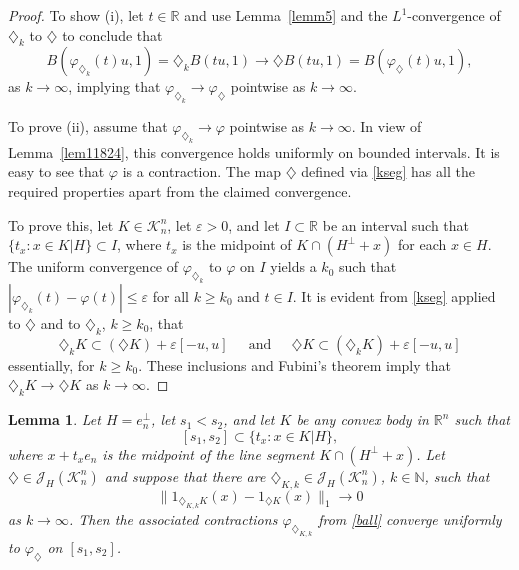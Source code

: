 \documentclass[12pt,reqno]{amsart}
\newcommand{\N}{{\mathbb N}}
\newcommand{\R}{{\mathbb R}}
\newcommand{\cK}{\mathcal K}
\newcommand{\cJ}{\mathcal J}
\newtheorem{lem}[thm]{Lemma}
\newcommand{\di}{\diamondsuit}
\numberwithin{equation}{section}
\begin{document}
\begin{proof}
To show (i), let $t\in \R$ and use Lemma~\ref{lemm5} and the $L^1$-convergence of $\di_k$ to $\di$ to conclude that
\[
B(\varphi_{\di_k}(t)u,1)=\di_k B(tu,1)\to\di B(tu,1)=B(\varphi_\di(t)u,1),
\]
as $k\to\infty$, implying that $\varphi_{\di_k}\to \varphi_\di$ pointwise as $k\to\infty$.

To prove (ii), assume that $\varphi_{\di_k}\to \varphi$ pointwise as $k\to\infty$. In view of Lemma~\ref{lem11824}, this convergence holds uniformly on bounded intervals. It is easy to see that $\varphi$ is a contraction.  The map $\di$ defined via \eqref{kseg} has all the required properties apart from the claimed convergence.

To prove this, let $K\in \cK_n^n$, let $\varepsilon>0$, and let $I\subset \R$ be an interval such that $\{t_x: x\in K|H\}\subset I$, where $t_x$ is the midpoint of $K\cap (H^{\perp}+x)$ for each $x\in H$. The uniform convergence of $\varphi_{\di_k}$ to $\varphi$ on $I$ yields a $k_0$ such that $|\varphi_{\di_k}(t)-\varphi(t)|\le \varepsilon$ for all $k\ge k_0$ and $t\in I$. It is evident from \eqref{kseg} applied to $\di$ and to $\di_k$, $k\ge k_0$, that
\[
 \di_k K\subset  (\di K)+\varepsilon [-u,u]~~\quad{\text{and}}~~\quad \di K\subset  (\di_k K)+\varepsilon [-u,u]
\]
essentially, for $k\ge k_0$. These inclusions and Fubini's theorem imply that $\di_kK\to \di K$ as $k\to\infty$.
\end{proof}

\begin{lem}\label{lem311}
Let $H=e_n^{\perp}$, let $s_1<s_2$, and let $K$ be any convex body in $\R^n$ such that
\begin{equation}\label{eq51}
[s_1,s_2]\subset\{t_x: x\in K|H\},
\end{equation}
where $x+t_xe_n$ is the midpoint of the line segment $K\cap (H^{\perp}+x)$.  Let $\di\in \cJ_H(\cK_n^n)$ and suppose that there are $\di_{K,k}\in \cJ_H(\cK_n^n)$, $k\in \N$, such that
\begin{equation}\label{eq3111}
\|1_{\di_{K,k}K}(x)-1_{\di K}(x)\|_1\to 0
\end{equation}
as $k\to \infty$.  Then the associated contractions $\varphi_{\di_{K,k}}$ from \eqref{ball} converge uniformly to $\varphi_{\di}$ on $[s_1,s_2]$.
\end{lem}
\end{document}
